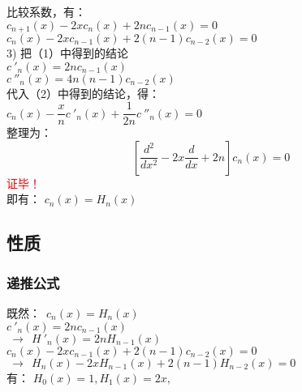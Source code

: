 \begin{frame}
	\frametitle{  }
	比较系数，有：\\
	\hspace{2.1cm}	{  $ c_{n+1}(x) -2xc_n(x) +2nc_{n-1} (x) =0 $} \\ \vspace{0.3cm}
	\hspace{2.1cm}	{  $ c_{n}(x) -2xc_{n-1}(x) +2(n-1)c_{n-2} (x) =0 $} \\ 
	3) 把（1）中得到的结论 \\
	\hspace{2.1cm}	{ $c~'_n(x)=2nc_{n-1}(x)$} \\  \vspace{0.3cm}
	\hspace{2.1cm}	$c~''_n(x)=4n(n-1)c_{n-2}(x)$ \\  
	代入（2）中得到的结论，得：\\
	\hspace{2.1cm} $  c_{n}(x) - \dfrac{x}{n}c~'_{n}(x) +\dfrac{1}{2n}c~''_{n} (x) =0 $ \\
	整理为：
	\begin{equation*}
 	    \left[  \dfrac{d^2}{dx^2} -2x\frac{d}{dx} +2n  \right] c_n(x)=0 
	\end{equation*}
 	\textcolor{red}{证毕！}\\
	即有： $c_n(x)=H_n(x)  $ 
\end{frame}

\subsection{性质}
\begin{frame}
	\frametitle{递推公式 }
	{  既然： $c_n(x)=H_n(x) $}  \\ \vspace{0.3cm}
	\hspace{1cm} 	{  $c~'_n(x)=2nc_{n-1}(x)    $ }   \\ 
	{  $ ~\to~~  H~'_n(x)=2nH_{n-1}(x)    $}   \\ \vspace{0.3cm}
	\hspace{1cm} 	{  $ c_{n}(x) -2xc_{n-1}(x) +2(n-1)c_{n-2} (x) =0  $ }   \\ 
	{  $~\to~~   H_{n}(x) -2xH_{n-1}(x) +2(n-1)H_{n-2} (x) =0  $ } \\ \vspace{0.3cm}
	有： $H_0(x)=1,  H_1(x)=2x, $	
\end{frame}

